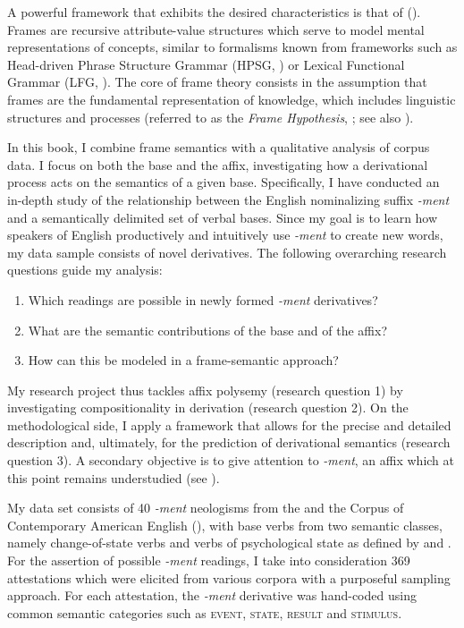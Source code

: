 A powerful framework that exhibits the desired characteristics is that of  (\citealt{Barsalou.1992a, Barsalou.1992b,Petersen.2007,Loebner.2013}). 
Frames are recursive attribute-value structures which serve to model mental representations of concepts, similar to formalisms known from frameworks such as Head-driven Phrase Structure Grammar (HPSG, \citealt{Pollard.1994}) or Lexical Functional Grammar (LFG, \citealt{Bresnan.1982}).
The core of frame theory consists in the assumption that frames are the fundamental representation of knowledge, which includes linguistic structures and processes (referred to as the \textit{Frame Hypothesis}, \citealt{Loebner.2014a,Loebner.2017}; see also \citealt{Petersen.2007}). 

In this book, I combine frame semantics with a qualitative analysis of corpus data. 
I focus on both the base and the affix, investigating how a derivational process acts on the semantics of a given base. 
Specifically, I have conducted an in-depth study of the relationship between the English nominalizing suffix \mbox{\textit{-ment}} and a semantically delimited set of verbal bases.
Since my goal is to learn how speakers of English productively and intuitively use \textit{-ment} to create new words, my data sample consists of novel derivatives. The following overarching research questions guide my analysis:

\begin{enumerate}
	\item Which readings are possible in newly formed \textit{-ment} derivatives?
	\item What are the semantic contributions of the base and of the affix? 
	\item How can this be modeled in a frame-semantic approach? 
\end{enumerate}
My research project thus tackles affix polysemy (research question 1) by investigating compositionality in derivation (research question 2). On the methodological side, I apply a framework that allows for the precise and detailed description and, ultimately, for the prediction of derivational semantics (research question 3). 
A secondary objective is to give attention to \textit{-ment}, an affix which at this point remains understudied (see \citealt[4]{Lieber.2016}).


My data set consists of 40 \textit{-ment} neologisms from the  and the Corpus of Contemporary American English (\citealt{Davies.2008}), with base verbs from two semantic classes, namely change-of-state verbs and verbs of psychological state as defined by \citet{Levin.1993} and \citet{Kipper.2008}.
For the assertion of possible \textit{-ment} readings, I take into consideration 369 attestations which were elicited from various corpora with a purposeful sampling approach. For each attestation, the \mbox{\textit{-ment}} derivative was hand-coded using common semantic categories such as \textsc{event, state, result} and \textsc{stimulus}.


